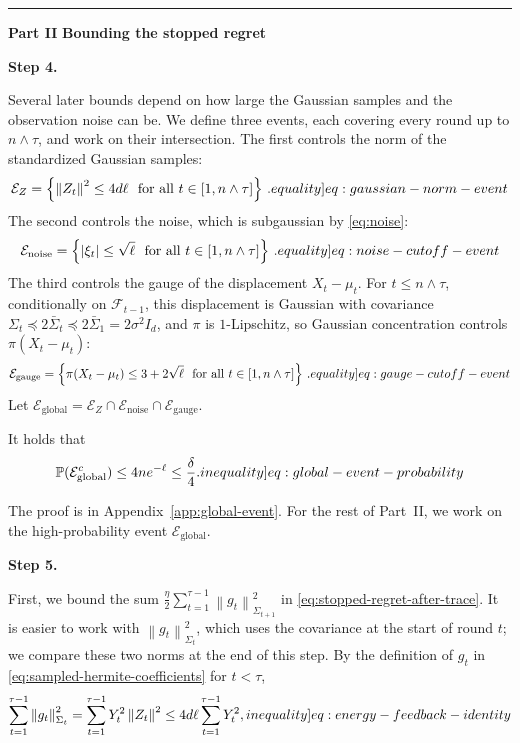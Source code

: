 \documentclass[12pt,cleveref]{jmlr}
\newcommand{\eqlabel}[1]{\label[equality]{#1}}
\newcommand{\ineqlabel}[1]{\label[inequality]{#1}}
\newcommand{\proofpart}[2]{%
    \par\addvspace{1.2\baselineskip}
    \noindent
    \textcolor{blue!55!black}{\rule[-0.2ex]{2pt}{1.25em}}%
    \hspace{0.6em}%
    {\sffamily\bfseries\color{blue!55!black}Part #1}%
    \hspace{0.8em}%
    {\sffamily\bfseries #2}%
    \par\nobreak\smallskip
    \noindent\ignorespaces
}
\newcommand{\proofstepinline}[1]{%
    \par\addvspace{0.6\baselineskip}
    \noindent
    {\normalfont\normalsize\bfseries\color{blue!55!black}Step #1.}\enspace\ignorespaces
}
\newcommand{\Pp}{\mathbb P}
\newcommand{\F}{\mathcal F}
\newcommand{\1}{\mathbf 1}
\newcommand{\norm}[1]{\left\lVert #1\right\rVert}
\newcommand{\normm}[2]{\left\lVert #1\right\rVert_{#2}}
\newcommand{\alireza}[1]{\todo[color=blue!20,size=\tiny]{Alireza: #1}}
\begin{document}
\proofpart{II}{Bounding the stopped regret}
\proofstepinline{4}
Several later bounds depend on how large the Gaussian samples and the observation noise can be.
We define three events, each covering every round up to $n\wedge\tau$, and work on their intersection.
The first controls the norm of the standardized Gaussian samples:
\begin{align}
    \mathcal E_Z
    =\left\{\norm{Z_t}^2\leq4d\ell\,\,
    \text{ for all }t\in [1, n \wedge \tau]\right\}\,.
    \eqlabel{eq:gaussian-norm-event}
\end{align}
The second controls the noise, which is subgaussian by \cref{eq:noise}:
\begin{align}
    \mathcal E_{\mathrm{noise}}
    =\left\{|\xi_t|\leq\sqrt\ell\,\,
    \text{ for all }t\in [1, n \wedge \tau]\right\}\,.
    \eqlabel{eq:noise-cutoff-event}
\end{align}
The third controls the gauge of the displacement $X_t-\mu_t$.
For $t\leq n\wedge\tau$, conditionally on $\F_{t-1}$, this displacement is Gaussian with covariance
$\Sigma_t\preceq2\bar{\Sigma}_t\preceq2\bar{\Sigma}_1=2\sigma^2I_d$,
and $\pi$ is $1$-Lipschitz, so Gaussian concentration controls $\pi(X_t-\mu_t)$:
\begin{align}
    \mathcal E_{\mathrm{gauge}}
    =\left\{\pi(X_t - \mu_t)\leq3+2\sqrt\ell\,\,
    \text{ for all }t\in [1, n \wedge \tau]\right\}\,.
    \eqlabel{eq:gauge-cutoff-event}
\end{align}
Let $\mathcal E_{\mathrm{global}} = \mathcal E_Z \cap \mathcal E_{\mathrm{noise}} \cap \mathcal E_{\mathrm{gauge}}$.
\begin{lemma}
    \label{lem:global-event}
    It holds that \alireza{checked}
    \begin{align}
        \Pp(\mathcal E_{\mathrm{global}}^c)
        \leq4ne^{-\ell}\leq\frac\delta4.
        \ineqlabel{eq:global-event-probability}
    \end{align}
\end{lemma}
The proof is in Appendix~\ref{app:global-event}.
For the rest of Part~II, we work on the high-probability event $\mathcal E_{\mathrm{global}}$.
\proofstepinline{5}
First, we bound the sum $\frac{\eta}{2}\sum_{t=1}^{\tau - 1}\normm{g_t}{\Sigma_{t+1}}^2$
in \cref{eq:stopped-regret-after-trace}.
It is easier to work with $\normm{g_t}{\Sigma_t}^2$, which uses the covariance at the start of round $t$;
we compare these two norms at the end of this step.
By the definition of $g_t$ in \cref{eq:sampled-hermite-coefficients} for $t<\tau$,
\begin{align}
    \sum_{t=1}^{\tau-1}
    \normm{g_t}{\Sigma_t}^2
    =
    \sum_{t=1}^{\tau-1}
    Y_t^2\norm{Z_t}^2
    \leq
    4d\ell
    \sum_{t=1}^{\tau-1}
    Y_t^2,
    \ineqlabel{eq:energy-feedback-identity}
\end{align}
\end{document}

